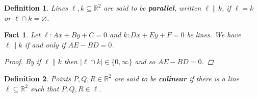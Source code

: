 \documentclass[a4paper,12pt]{report}
\newtheorem{definition}{Definition}
\newtheorem{fact}{Fact}
\begin{document}
\begin{definition}
  Lines $\ell,k\subseteq\mathbb{R}^2$ are said to be \textbf{parallel}, written $\ell\parallel k$, if $\ell =k$ or $\ell\cap k=\varnothing$.
\end{definition}

\begin{fact}\label{Condition for Parallelity}
Let $\ell:Ax+By+C=0$ and $k:Dx+Ey+F=0$ be lines. We have $\ell\parallel k$ if and only if $AE-BD=0$.
\begin{proof}
  By  if $\ell\parallel k$ then $|\ell\cap k|\in\{0,\infty\}$ and so $AE-BD=0$.
\end{proof}
\end{fact}

\begin{definition}
  Points $P,Q,R\in\mathbb{R}^2$ are said to be \textbf{colinear} if there is a line $\ell\subseteq\mathbb{R}^2$ such that $P,Q,R\in\ell$.
\end{definition}
\end{document}
